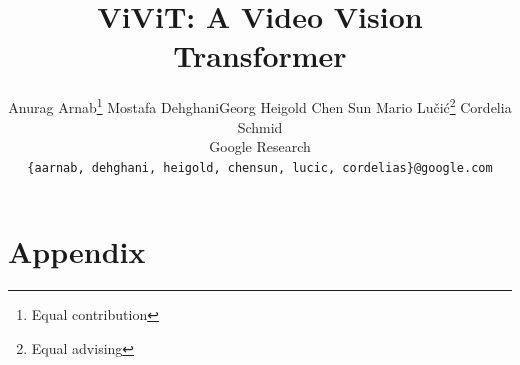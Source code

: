 \documentclass[10pt,twocolumn,letterpaper]{article}
\begin{document}
\title{\vspace{-\baselineskip} ViViT: A Video Vision Transformer}

\author{Anurag Arnab\thanks{Equal contribution} \quad Mostafa Dehghani\footnotemark[1] \quad Georg Heigold \quad Chen Sun \quad Mario Lučić\thanks{Equal advising}  \quad  Cordelia Schmid\footnotemark[2] \\
Google Research \\
{\tt\small \{aarnab, dehghani, heigold, chensun, lucic, cordelias\}@google.com}
}

\maketitle
\ificcvfinal\thispagestyle{empty}\fi










{\small


}

\clearpage
\appendix

\section*{Appendix}

\end{document}

